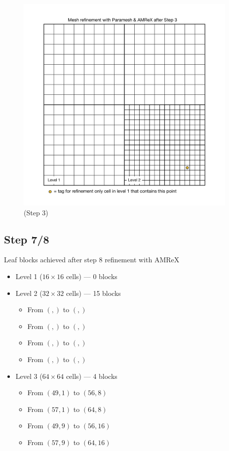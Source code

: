 \documentclass[12pt,letterpaper]{article}
\begin{document}
\begin{figure}[!hp]
\begin{center}
\includegraphics[width=4.25in]{TestRefine_Step6_Both.pdf}
\caption{(Step 3) }
\end{center}
\end{figure}

\newpage
\subsection{Step 7/8}
Leaf blocks achieved after step 8 refinement with AMReX
\begin{itemize}
\item{Level 1 ($16 \times 16$ cells) --- 0 blocks}
\item{Level 2 ($32 \times 32$ cells) --- 15 blocks}
    \begin{itemize}
    \item{From $(,)$ to $(,)$}
    \item{From $(,)$ to $(,)$}
    \item{From $(,)$ to $(,)$}
    \item{From $(,)$ to $(,)$}
    \end{itemize}
\item{Level 3 ($64 \times 64$ cells) --- 4 blocks}
    \begin{itemize}
    \item{From $(49,1)$ to $(56, 8)$}
    \item{From $(57,1)$ to $(64, 8)$}
    \item{From $(49,9)$ to $(56,16)$}
    \item{From $(57,9)$ to $(64,16)$}
    \end{itemize}
\end{itemize}
\end{document}

